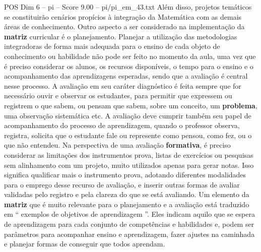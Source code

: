 \begin{textsample}{POS Dim 6 – pi – Score 9.00 – pi/pi\_em\_43.txt}
Além disso, projetos temáticos se constituirão cenários propícios à integração da Matemática com as demais áreas de conhecimento.
Outro aspecto a ser considerado na implementação da \textbf{matriz} curricular é o planejamento.
Planejar a utilização das metodologias integradoras de forma mais adequada para o ensino de cada objeto de conhecimento ou habilidade não pode ser feito no momento da aula, uma vez que é preciso considerar os alunos, os recursos disponíveis, o tempo para o ensino e o acompanhamento das aprendizagens esperadas, sendo que a avaliação é central nesse processo.
A avaliação em seu caráter diagnóstico é feita sempre que for necessário ouvir e observar os estudantes, para permitir que expressem ou registrem o que sabem, ou pensam que sabem, sobre um conceito, um \textbf{problema}, uma observação sistemática etc.
A avaliação deve cumprir também seu papel de acompanhamento do processo de aprendizagem, quando o professor observa, registra, solicita que o estudante fale ou represente como pensou, como fez, ou o que não entendeu.
Na perspectiva de uma avaliação \textbf{formativa}, é preciso considerar as limitações dos instrumentos prova, listas de exercícios ou pesquisas sem alinhamento com um projeto, muito utilizados apenas para gerar notas.
Isso significa qualificar mais o instrumento prova, adotando diferentes modalidades para o emprego desse recurso de avaliação, e inserir outras formas de avaliar validadas pelo registro e pela clareza do que se está avaliando.
Um elemento da \textbf{matriz} que é muito relevante para o planejamento e a avaliação está traduzido em “ exemplos de objetivos de aprendizagem ”.
Eles indicam aquilo que se espera de aprendizagem para cada conjunto de competências e habilidades e, podem ser parâmetros para acompanhar ensino e aprendizagem, fazer ajustes na caminhada e planejar formas de conseguir que todos aprendam.

\end{textsample}
